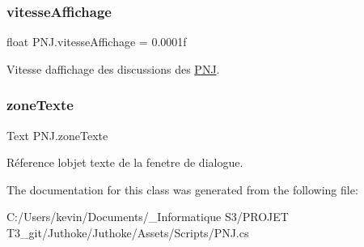 \subsubsection{\texorpdfstring{vitesse\+Affichage}{vitesseAffichage}}
{\footnotesize\ttfamily float P\+N\+J.\+vitesse\+Affichage = 0.\+0001f\hspace{0.3cm}{\ttfamily [private]}}

Vitesse d\textquotesingle{}affichage des discussions des \mbox{\hyperlink{class_p_n_j}{P\+NJ}}. \mbox{\label{class_p_n_j_adb5494c77012b75c00b3d7598588a67f}} 
\subsubsection{\texorpdfstring{zone\+Texte}{zoneTexte}}
{\footnotesize\ttfamily Text P\+N\+J.\+zone\+Texte\hspace{0.3cm}{\ttfamily [private]}}

Réference l\textquotesingle{}objet texte de la fenetre de dialogue. 

The documentation for this class was generated from the following file\+:\begin{DoxyCompactItemize}
\item 
C\+:/\+Users/kevin/\+Documents/\+\_\+\+Informatique S3/\+P\+R\+O\+J\+E\+T T3\+\_\+git/\+Juthoke/\+Juthoke/\+Assets/\+Scripts/P\+N\+J.\+cs\end{DoxyCompactItemize}
